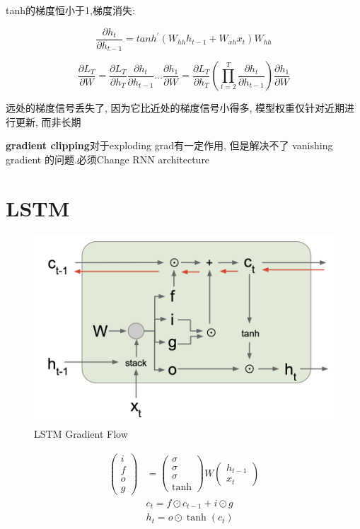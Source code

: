	tanh的梯度恒小于1,梯度消失:

	\[
		\frac{\partial h_t}{\partial h_{t-1}}=tanh^{\prime}(W_{hh}h_{t-1}+W_{xh}x_t)W_{hh}	
	\]

	\[
		\frac{\partial L_T}{\partial W}=\frac{\partial L_T}{\partial h_T}\frac{\partial h_t}{\partial h_{t-1}}\ldots\frac{\partial h_1}{\partial W}=\frac{\partial L_T}{\partial h_T}(\prod_{t=2}^T\frac{\partial h_t}{\partial h_{t-1}})\frac{\partial h_1}{\partial W}	
	\]

	远处的梯度信号丢失了, 因为它比近处的梯度信号小得多, 模型权重仅针对近期进行更新, 而非长期
	
	\textbf{gradient clipping}对于exploding grad有一定作用, 但是解决不了 vanishing gradient 的问题.必须Change RNN architecture
	
	\section{LSTM}

	\begin{figure}[H]
		\centering
		\includegraphics[scale=0.2]{figures/lstm_grad_flow.png}
		\caption{LSTM Gradient Flow}
	\end{figure}

	\[
	\begin{aligned}
		\begin{pmatrix}i\\f\\o\\g\end{pmatrix}& =\begin{pmatrix}\sigma\\\sigma\\\sigma\\\tanh\end{pmatrix}W\begin{pmatrix}h_{t-1}\\x_t\end{pmatrix}  \\
		&c_{t} =f\odot c_{t-1}+i\odot g  \\
		&h_{t} =o\odot\tanh(c_t) 
	\end{aligned}
	\]

